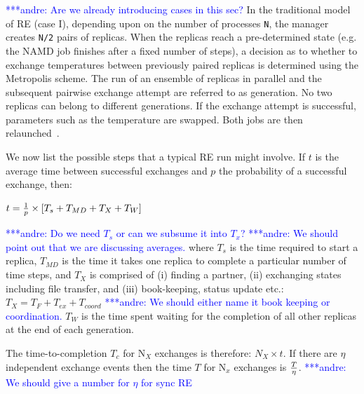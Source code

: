 \documentclass{rspublic}
\newcommand{\alnote}[1]{ {\textcolor{blue} { ***andre: #1 }}}
\newcommand{\alnote}[1]{}
\begin{document}
\alnote{Are we already introducing cases in this sec?}
In the traditional model of RE (case I), depending upon
on the number of processes \texttt{N}, the manager creates \texttt{N/2} pairs
of replicas. When the replicas reach a
pre-determined state (e.g. the NAMD job finishes after a fixed number
of steps), a decision as to whether to exchange temperatures between
previously paired replicas is determined using the Metropolis scheme.
The run of an ensemble of replicas in parallel and the subsequent
pairwise exchange attempt are referred to as generation. No two
replicas can belong to different generations. If the exchange attempt
is successful, parameters such as the temperature are swapped. Both
jobs are then relaunched~\citep{Luckow:2008fp}.

We now list the possible steps that a typical RE run might involve. If $t$ is the average time between successful exchanges and $p$ the probability of a successful exchange, then:

$t =  {1 \over p} \times {[T_s+T_{MD} + T_{X} + T_{W}]}$

\alnote{Do we need $T_{s}$ or can we subsume it into $T_{x}$?}
\alnote{We should point out that we are discussing averages.}
where $T_{s}$ is the time required to start a replica, $T_{MD}$ is the time 
it takes one replica to complete a particular number of time steps,
and $T_{X}$ is comprised of (i) finding a partner, (ii) exchanging
states including file transfer, and (iii) book-keeping, status update
etc.: ${T_{X}} = {T_F + T_{ex} + T_{coord}}$ \alnote{We should either name it
book keeping or coordination.} $T_{W}$ is the time spent waiting for the completion
of all other replicas at the end of each generation.

The time-to-completion $T_{c}$ for N$_{X}$ exchanges is therefore: $N_{X} \times t$.
If there are $\eta$ independent exchange events then the time $T$ for 
N$_x$ exchanges is $T \over \eta$. \alnote{We should give a number for $\eta$ for sync RE}
\end{document}

